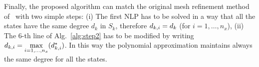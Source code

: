 Finally, the proposed algorithm can match the original mesh refinement method of~\cite{Patterson:OCAM:2015} with two simple steps: (i) The first NLP has to be solved in a way that all the states have the same degree $d_k$ in $S_k$, therefore $d_{k,i} = d_k$ (for $i = 1, \dots, n_x$), (ii) The $6$-th line of Alg.~\ref{alg:step2} has to be modified by writing $d_{k,i} = \max\limits_{i= 1, \dots, n_x}(d_{k,i}^{*})$. In this way the polynomial approximation maintains always the same degree for all the states.




